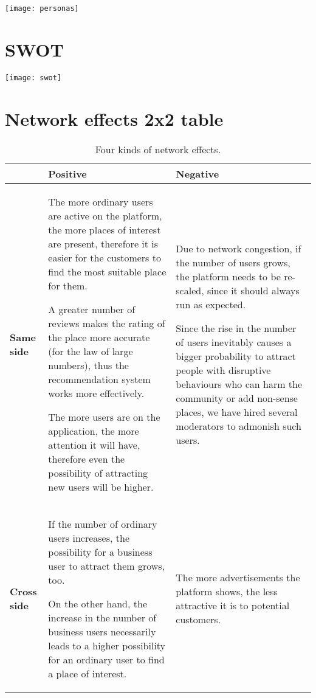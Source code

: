 \documentclass[letterpaper, 11pt]{Proposal}
\begin{document}
\texttt{[image: personas]}

\section{SWOT}\label{sec:swot}

\texttt{[image: swot]}

\clearpage

\section{Network effects 2x2 table}\label{sec:network_effects}
\begin{table}[h]
    \centering
    \begin{tabularx}{\linewidth}{sbm}
         \toprule
            & \textbf{Positive}
            & \textbf{Negative} \\
        \midrule
           \textbf{Same side}
          & The more ordinary users are active on the platform, the more places of interest are present, therefore it is easier for the customers to find the most suitable place for them. 
          
          A greater number of reviews makes the rating of the place more accurate (for the law of large numbers), thus the recommendation system works more effectively. 
          
          The more users are on the application, the more attention it will have, therefore even the possibility of attracting new users will be higher.
          & Due to network congestion, if the number of users grows, the platform needs to be re-scaled, since it should always run as expected.
          
          Since the rise in the number of users inevitably causes a bigger probability to attract people with disruptive behaviours who can harm the community or add non-sense places, we have hired several moderators to admonish such users. \\
          \midrule
          \textbf{Cross side}
          & If the number of ordinary users increases, the possibility for a business user to attract them grows, too. 
          
          On the other hand, the increase in the number of business users necessarily leads to a higher possibility for an ordinary user to find a place of interest.
          &  The more advertisements the platform shows, the less attractive it is to potential customers.\\
        \bottomrule
    \end{tabularx}
    \caption{Four kinds of network effects.}
\end{table}
\end{document}
